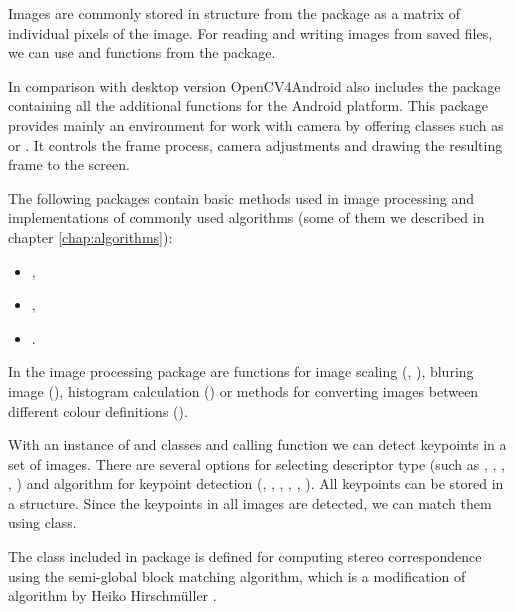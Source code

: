 Images are commonly stored in  structure from the  package as a matrix of individual pixels of the image.
For reading and writing images from saved files, we can use  and  functions from the  package.

In comparison with desktop version OpenCV4Android also includes the  package containing all the additional functions for the Android platform.
This package provides mainly an environment for work with camera by offering classes such as  or .
It controls the frame process, camera adjustments and drawing the resulting frame to the screen.

The following packages contain basic methods used in image processing and implementations of commonly used algorithms (some of them we described in chapter \ref{chap:algorithms}):
\begin{itemize}
  \item {},
  \item {},
  \item {}.
\end{itemize}

In the image processing package are functions for image scaling (, ), bluring image (), histogram calculation () 
or methods for converting images between different colour definitions ().

With an instance of  and  classes and calling  function we can detect keypoints in a set of images.
There are several options for selecting descriptor type (such as , , , , ) and algorithm for keypoint detection (, , , , , ).
All keypoints can be stored in a  structure.
Since the keypoints in all images are detected, we can match them using  class.

The  class included in  package is defined for computing stereo correspondence using the semi-global block matching algorithm, which is a modification of algorithm by Heiko Hirschmüller \cite{hirschmuller2008}.

